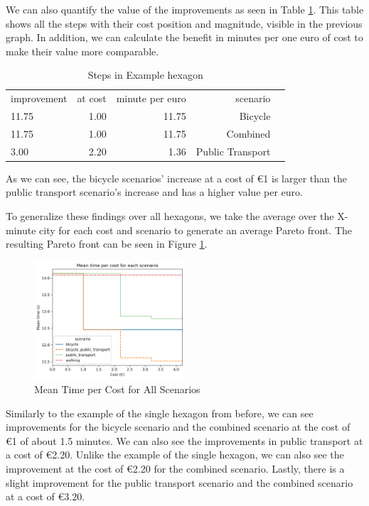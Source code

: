 We can also quantify the value of the improvements as seen in Table \ref{tab:differences_in_example_hexagon}.
This table shows all the steps with their cost position and magnitude, visible in the previous graph.
In addition, we can calculate the benefit in minutes per one euro of cost to make their value more comparable.
\begin{table}
  \caption{Steps in Example hexagon}
  \label{tab:differences_in_example_hexagon}
  \begin{center}
    \begin{tabular}{lrrrl}
     improvement & at cost & minute per euro & scenario \\
     11.75 & 1.00 & 11.75 & Bicycle \\
     11.75 & 1.00 & 11.75 & Combined \\
     3.00 & 2.20 & 1.36 & Public Transport \\
    \end{tabular}
  \end{center}
\end{table}
As we can see, the bicycle scenarios' increase at a cost of \euro{1} is larger than the public transport scenario's increase and has a higher value per euro.

To generalize these findings over all hexagons, we take the average over the X-minute city for each cost and scenario to generate an average Pareto front.
The resulting Pareto front can be seen in Figure \ref{fig:mean_time_per_cost}.

\begin{figure}
  \begin{center}
     \includegraphics[width=0.5\textwidth]{Figures/results/metric_cost/mean_time_per_cost}
  \end{center}
  \caption{Mean Time per Cost for All Scenarios}
  \label{fig:mean_time_per_cost}
\end{figure}

Similarly to the example of the single hexagon from before, we can see improvements for the bicycle scenario and the combined scenario at the cost of \euro{1} of about 1.5 minutes.
We can also see the improvements in public transport at a cost of \euro{2.20}.
Unlike the example of the single hexagon, we can also see the improvement at the cost of \euro{2.20} for the combined scenario.
Lastly, there is a slight improvement for the public transport scenario and the combined scenario at a cost of \euro{3.20}.


